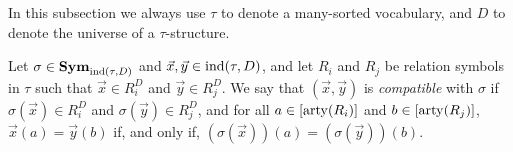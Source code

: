 \documentclass[../paper.tex]{subfiles}
\begin{document}


In this subsection we always use $\tau$ to denote a many-sorted vocabulary, and $D$ to denote the universe of a $\tau$-structure.


\begin{definition}
  Let $\sigma \in \text{\textbf{Sym}}_{\text{\upshape ind}(\tau, D)}$ and $\vec{x}, \vec{y} \in
  \text{\upshape ind}(\tau, D)$, and let $R_i$ and $R_j$ be relation symbols in $\tau$ such that $\vec{x} \in R^{D}_i$ and
  $\vec{y} \in R^{D}_j$. We say that $(\vec{x}, \vec{y})$ is
  \emph{compatible} with $\sigma$ if $\sigma (\vec{x}) \in R^{D}_i$
  and $\sigma (\vec{y}) \in R^D_j$, and for all $a \in [\mathrm{arty}(R_i)]$
  and $b \in [\mathrm{arty}(R_j)]$, $\vec{x}(a) = \vec{y}(b)$ if, and only if, $(\sigma
  (\vec{x}))(a) = (\sigma(\vec{y}))(b)$.

\end{definition}
\end{document}
